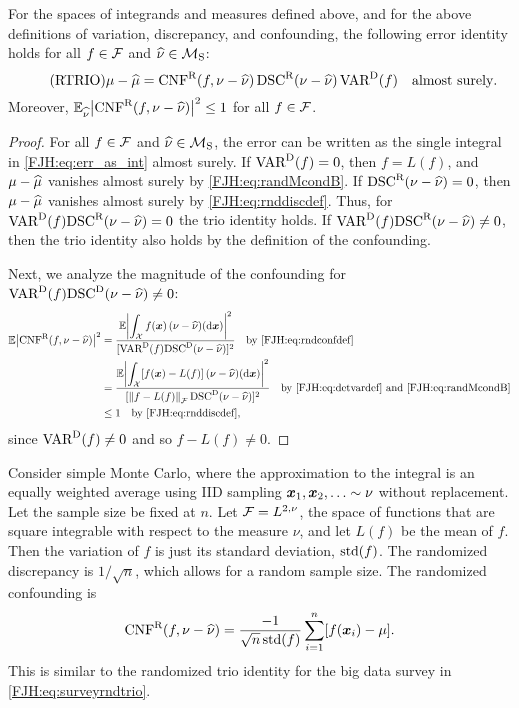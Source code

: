 \documentclass[graybox,footinfo]{svmult}
\begin{document}
\begin{theorem}  \label{FJH:thm:rtrio} For the spaces of 
integrands and 
	measures defined above, and for the above definitions of variation, discrepancy, and 
	confounding, the following error identity holds for all $f \in {\mathcal{F}}$ and $\widehat{\nu}  \in 
	{\mathcal{M}}_{\textup{S}}$: 
	\begin{equation} \tag{RTRIO} \label{FJH:eq:rtrio}
	\mu - \hmu  = \algn^\Rn(f,\nu - \hnu) \, \disc^\Rn(\nu - \hnu) \, \Var^{\Dt}(f) \quad 
	\text{almost surely}.
	\end{equation}
	Moreover, ${\mathbb{E}}_{\widehat{\nu}} \bigl \lvert \textup{CNF}^{\textup{R}}(f,\nu - \widehat{\nu}) \bigr \rvert^2  \le 1$ for all $f \in 
	{\mathcal{F}}$. 
\end{theorem}
\begin{proof}  For all $f \in {\mathcal{F}}$ and $\widehat{\nu}  \in {\mathcal{M}}_{\textup{S}}$, the error can be 
written as the single integral in \eqref{FJH:eq:err_as_int} almost surely. 	If $\textup{VAR}^{\textup{D}}(f) 
= 0$, then $f = L(f)$, and $\mu - \widehat{\mu}$ vanishes almost surely by
\eqref{FJH:eq:randMcondB}.  If 
$\textup{DSC}^{\textup{R}}(\nu - \widehat{\nu}) = 0$, then $\mu - \widehat{\mu}$
	vanishes almost surely by \eqref{FJH:eq:rnddiscdef}.  Thus, for $\textup{VAR}^{\textup{D}}(f) 
	\textup{DSC}^{\textup{R}}(\nu - \widehat{\nu}) = 
	0$ 
	the trio identity holds. If $\textup{VAR}^{\textup{D}}(f) \textup{DSC}^{\textup{R}}(\nu - \widehat{\nu}) \ne 0$, then the trio 
	identity also holds by the definition of the confounding.
	
	Next, we analyze the magnitude of the confounding for $\textup{VAR}^{\textup{D}}(f) \textup{DSC}^{\textup{D}}(\nu - 
	\widehat{\nu}) \ne 0$: 
	\begin{align*}
	{\mathbb{E}} \bigl \lvert \textup{CNF}^{\textup{R}}(f,\nu - \widehat{\nu}) \bigr \rvert^2 & = 
	\frac{{\mathbb{E}} \biggl \lvert\displaystyle\int_{{\mathcal{X}}} f({\boldsymbol{x}}) \, (\nu - \widehat{\nu})(\mathrm{d} 
		{\boldsymbol{x}}) \biggr \rvert^2 }{[\textup{VAR}^{\textup{D}}(f)\textup{DSC}^{\textup{D}}(\nu - \widehat{\nu})]^2} \quad \text{by 
		\eqref{FJH:eq:rndconfdef}}\\
	& = \frac{{\mathbb{E}} \biggl \lvert\displaystyle\int_{{\mathcal{X}}} [f({\boldsymbol{x}}) - L(f)] \, (\nu - \widehat{\nu})(\mathrm{d} 
		{\boldsymbol{x}}) \biggr \rvert^2}{[\left \lVert f-L(f) \right \rVert_{{\mathcal{F}}}\textup{DSC}^{\textup{D}}(\nu - \widehat{\nu})]^2} \quad \text{by 
		\eqref{FJH:eq:detvardef} and \eqref{FJH:eq:randMcondB}} \\
	& \le 1 \quad \text{by \eqref{FJH:eq:rnddiscdef}},
	\end{align*}
	since $\textup{VAR}^{\textup{D}}(f) \ne 0$ and so $f - L(f) \ne 0$.
\end{proof}

Consider simple Monte Carlo, where the approximation to the integral is an equally 
weighted average using IID sampling ${\boldsymbol{x}}_1, {\boldsymbol{x}}_2, \ldots \sim 
\nu$ without 
replacement. Let the sample size be fixed at $n$.
Let ${\mathcal{F}} = L^{2,\nu}$, the space of functions that are square integrable with respect to 
the measure $\nu$, and let $L(f)$ be the mean of $f$.  Then the variation of $f$ is just 
its standard 
deviation, $\textup{std}(f)$.  The randomized discrepancy is 
$1/\sqrt{n}$, which allows for a random sample size.  The randomized 
confounding is 
\begin{align*}
\textup{CNF}^{\textup{R}}(f,\nu - \widehat{\nu}) = \frac{-1}{ \sqrt{n}\, \textup{std}(f)}    \sum_{i=1}^n [f({\boldsymbol{x}}_i) - 
\mu].
\end{align*}
This is similar to the randomized trio identity for the big data survey in 
\eqref{FJH:eq:surveyrndtrio}.
\end{document}
